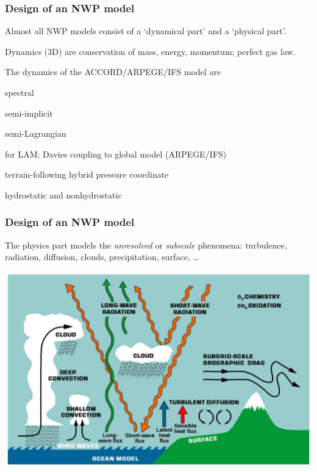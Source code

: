 \documentclass[aspectratio=43,9pt]{beamer}
\begin{document}
%
%
\begin{frame}
	\frametitle{Design of an NWP model}
	\begin{myitemize}{3ex}
		\item Almost all NWP models consist of a `dynamical part' and a `physical part'.
		\item Dynamics (3D) are conservation of mass, energy, momentum; perfect gas law.
		\item The dynamics of the ACCORD/ARPEGE/IFS model are
			\begin{myitemize}{1ex}
				\item spectral
				\item semi-implicit
				\item semi-Lagrangian
				\item for LAM: Davies coupling to global model (ARPEGE/IFS)
				\item terrain-following hybrid pressure coordinate
				\item hydrostatic and nonhydrostatic
			\end{myitemize}
	\end{myitemize}
\end{frame}
%
%
\begin{frame}
	\frametitle{Design of an NWP model}
	\begin{myitemize}{2ex}
		\item The physics part models the \emph{unresolved} or \emph{subscale} phenomena: turbulence, radiation, diffusion, clouds, precipitation, surface, \ldots
			\begin{center}
				\includegraphics[width=.7\textwidth]{physics}
			\end{center}
	\end{myitemize}
\end{frame}
\end{document}

